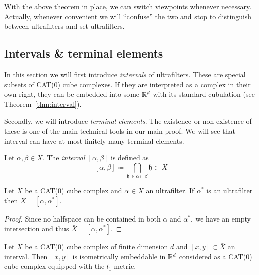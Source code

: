 \begin{rem}
  With the above theorem in place, we can switch viewpoints whenever necessary. Actually, whenever convenient we will \enquote{confuse} the two and stop to distinguish between ultrafilters and set-ultrafilters.
\end{rem}

\subsection{Intervals \& terminal elements}
\label{sec:terminal-elements}

In this section we will first introduce \emph{intervals} of ultrafilters. These are special subsets of CAT(0) cube complexes. If they are interpreted as a complex in their own right, they can be embedded into some \(\mathbb{R}^d\) with its standard cubulation (see Theorem~\ref{thm:interval}).

Secondly, we will introduce \emph{terminal elements}. The existence or non-existence of these is one of the main technical tools in our main proof. We will see that interval can have at most finitely many terminal elements.

\begin{defin}
  \label{defin:uf-interval}
  Let \(\alpha,\beta \in \bar X\). The \emph{interval \([\alpha,\beta]\)} is defined as
  \[
    [\alpha,\beta] \coloneqq \bigcap_{\mathfrak{h} \in \alpha \cap \beta} \mathfrak{h} \subset X
  \]
\end{defin}

\begin{lemma}
  \label{lem:x-interval}
  Let \(X\) be a CAT(0) cube complex and \(\alpha \in \bar X\) an ultrafilter. If \(\alpha^\ast\) is an ultrafilter then \(\bar X = [\alpha, \alpha^\ast]\).
\end{lemma}

\begin{proof}
  Since no halfspace can be contained in both \(\alpha\) and \(\alpha^\ast\), we have an empty intersection and thus \(\bar X = [\alpha, \alpha^\ast]\).
\end{proof}

\begin{thm}
  \label{thm:interval}
  Let \(X\) be a CAT(0) cube complex of finite dimension \(d\) and \([x,y] \subset \bar X\) an interval. Then \([x,y]\) is isometrically embeddable in \(\mathbb{R}^d\) considered as a CAT(0) cube complex equipped with the \(l_1\)-metric.
\end{thm}

